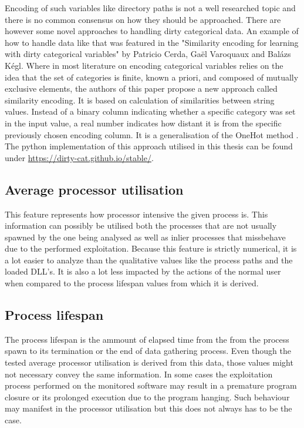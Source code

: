 \documentclass[a4paper,twoside,12pt]{book}
\begin{document}
Encoding of such variables like directory paths is not a well researched topic and there is no 
common consensus on how they should be approached. There are however some novel approaches to 
handling dirty categorical data. An example of how to handle data like that was featured in the 
"Similarity encoding for learning with dirty categorical variables" by Patricio Cerda,  Ga{\"e}l 
Varoquaux and Bal{\'a}zs K{\'e}gl. Where in most literature on encoding categorical variables 
relies on the idea that the set of categories is finite, known a priori, and composed of mutually 
exclusive elements, the authors of this paper propose a new approach called similarity encoding. 
It is based on calculation of similarities between string values. Instead of a binary column 
indicating whether a specific category was set in the input value, a real number indicates how 
distant it is from the specific previously chosen encoding column. It is a generalisation of the 
OneHot method \cite{bib:dirtycat}. The python implementation of this approach utilised in this thesis 
can be found under \url{https://dirty-cat.github.io/stable/}.


\subsection{Average processor utilisation}

This feature represents how processor intensive the given process is. This information can possibly 
be utilised both the processes that are not usually spawned by the one being analysed as well as
inlier processes that missbehave due to the performed exploitation. Because this feature is 
strictly numerical, it is a lot easier to analyze than the qualitative values like the process
paths and the loaded DLL's. It is also a lot less impacted by the actions of the normal user when
compared to the process lifespan values from which it is derived.

\subsection{Process lifespan}

The process lifespan is the ammount of elapsed time from the from the process spawn to its
termination or the end of data gathering process. Even though the tested average processor utilisation 
is derived from this data, those values might not necessary convey the same information. In some cases
the exploitation process performed on the monitored software may result in a premature program
closure or its prolonged execution due to the program hanging. Such behaviour may manifest in the
processor utilisation but this does not always has to be the case. 
\end{document}
